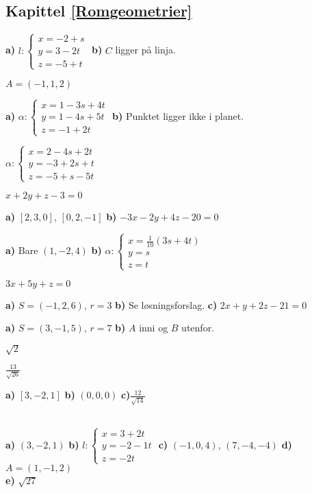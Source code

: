 %




\subsection*{Kapittel \ref{Romgeometrier}}
\footnotesize
{} \textbf{a)} $ l: \left\lbrace{
	\begin{array}{l}
	x=-2 + s  \\
	y= 3-2t   \\
	z= -5+t 
	\end{array}
}\right. $ \textbf{b)} $ C $ ligger på linja.

 $ A=(-1, 1, 2) $

 \textbf{a)} $ \alpha: \left\lbrace{
	\begin{array}{l}
	x=1-3s+4t \\
	y=1-4s+5t \\
	z=-1 +2t
	\end{array}
}\right.  $ \textbf{b)} Punktet ligger ikke i planet.

 $ \alpha: \left\lbrace{
	\begin{array}{l}
	x=2-4s+2t \\
	y=-3+2s+t \\
	z=-5+s -5t
	\end{array}
}\right.  $

 $ x+2y+z-3=0 $

 \textbf{a)} $ [2, 3, 0] $, $ [0, 2, -1] $ \textbf{b)} $ -3x -2y+4z -20=0  $

\textbf{a)} Bare $ (1, -2, 4) $
\textbf{b)}
$ \alpha: \left\lbrace{
	\begin{array}{l}
	x=\frac{1}{10}(3s+4t) \\
	y=s \\
	z=t
	\end{array}
}\right.  $

 $ 3x+5y + z = 0 $

\textbf{a)} $ S=(-1, 2, 6) $, $ r=3 $ \textbf{b)} Se løsningsforslag. 
\textbf{c)} $ 2x + y + 2z - 21 =0$

\textbf{a)} $ S=(3, -1, 5) $, $ r=7 $ 
\textbf{b)} $ A $ inni og $ B $ utenfor.

 $ \sqrt{2} $

 $ \frac{13}{\sqrt{26}} $

 \textbf{a)} $ [3, -2, 1] $ \textbf{b)} $ (0, 0, 0) $ \textbf{c)}$ \frac{12}{\sqrt{14}} $

 \\
\textbf{a)} $ (3, -2, 1) $ \textbf{b) }$  l: \left\lbrace{
	\begin{array}{l}
	x=3+ 2t  \\
	y=-2-1t   \\
	z=-2t 
	\end{array}
}\right.  $  \textbf{c)} $ (-1, 0, 4) $, $ (7, -4, -4) $ \textbf{d)} $ A=(1, -1, 2) $\\
\textbf{e)} $ \sqrt{27} $

